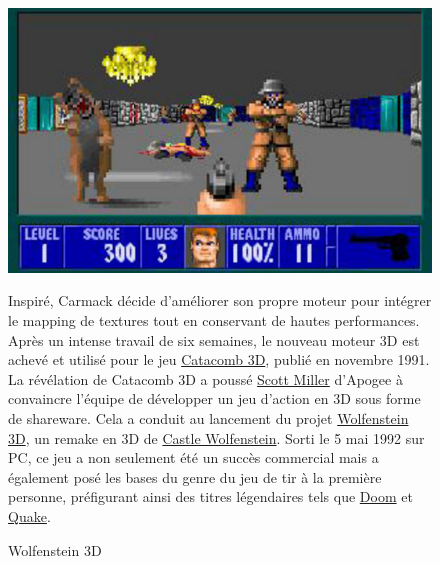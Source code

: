 \documentclass[12pt]{report}
\begin{document}
\begin{figure}[H]
	\begin{minipage}{0.48\textwidth}
		\centering
		\includegraphics[width=\linewidth]{image/wolfenstein_3d.jpg}
		\hspace*{-0.5cm}
		\caption{Wolfenstein 3D}
		\label{fig:wolfenstein3d}
	\end{minipage}\hfill
	\begin{minipage}{0.48\textwidth}
		Inspiré, Carmack décide d'améliorer son propre moteur pour 
		intégrer le mapping de textures tout en conservant de hautes performances. Après un intense travail de six semaines, 
		le nouveau moteur 3D est achevé et utilisé pour le jeu \href{https://fr.wikipedia.org/wiki/Catacomb_3D}{Catacomb 3D},
		publié en novembre 1991. La révélation de Catacomb 3D a poussé 
		\href{https://fr.wikipedia.org/wiki/Scott_Miller_(programmeur)}{Scott Miller} d'Apogee à convaincre l'équipe de 
		développer un jeu d'action en 3D sous forme de shareware. Cela a conduit au lancement du projet 
		\href{https://fr.wikipedia.org/wiki/Wolfenstein_3D}{Wolfenstein 3D}, un remake en 3D de 
		\href{https://fr.wikipedia.org/wiki/Castle_Wolfenstein}{Castle Wolfenstein}. Sorti le 5 mai 1992 sur PC, ce jeu a 
		non seulement été un succès commercial mais a également posé les bases du genre du jeu de tir à la première personne, 
		préfigurant ainsi des titres légendaires tels que 
		\href{https://fr.wikipedia.org/wiki/Doom_(jeu_vid%C3%A9o,_1993)}{Doom} et 
		\href{https://fr.wikipedia.org/wiki/Quake}{Quake}.
	\end{minipage}
\end{figure}

\end{document}
